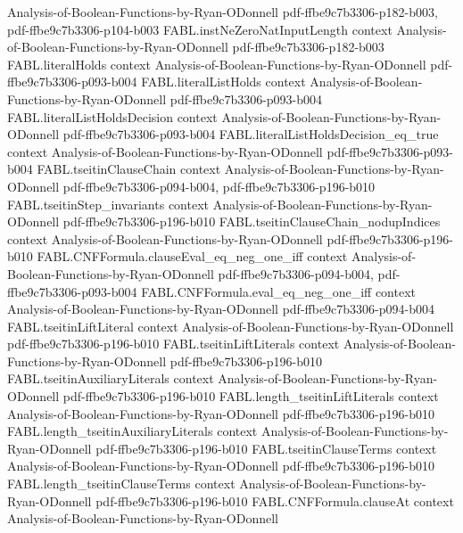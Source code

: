 \begin{theorem}
  {Analysis-of-Boolean-Functions-by-Ryan-ODonnell}
  {pdf-ffbe9c7b3306-p182-b003,
    pdf-ffbe9c7b3306-p104-b003}
\proofstep
  {FABL.instNeZeroNatInputLength}
  {context}
  {Analysis-of-Boolean-Functions-by-Ryan-ODonnell}
  {pdf-ffbe9c7b3306-p182-b003}
\proofstep
  {FABL.literalHolds}
  {context}
  {Analysis-of-Boolean-Functions-by-Ryan-ODonnell}
  {pdf-ffbe9c7b3306-p093-b004}
\proofstep
  {FABL.literalListHolds}
  {context}
  {Analysis-of-Boolean-Functions-by-Ryan-ODonnell}
  {pdf-ffbe9c7b3306-p093-b004}
\proofstep
  {FABL.literalListHoldsDecision}
  {context}
  {Analysis-of-Boolean-Functions-by-Ryan-ODonnell}
  {pdf-ffbe9c7b3306-p093-b004}
\proofstep
  {FABL.literalListHoldsDecision_eq_true}
  {context}
  {Analysis-of-Boolean-Functions-by-Ryan-ODonnell}
  {pdf-ffbe9c7b3306-p093-b004}
\proofstep
  {FABL.tseitinClauseChain}
  {context}
  {Analysis-of-Boolean-Functions-by-Ryan-ODonnell}
  {pdf-ffbe9c7b3306-p094-b004,
    pdf-ffbe9c7b3306-p196-b010}
\proofstep
  {FABL.tseitinStep_invariants}
  {context}
  {Analysis-of-Boolean-Functions-by-Ryan-ODonnell}
  {pdf-ffbe9c7b3306-p196-b010}
\proofstep
  {FABL.tseitinClauseChain_nodupIndices}
  {context}
  {Analysis-of-Boolean-Functions-by-Ryan-ODonnell}
  {pdf-ffbe9c7b3306-p196-b010}
\proofstep
  {FABL.CNFFormula.clauseEval_eq_neg_one_iff}
  {context}
  {Analysis-of-Boolean-Functions-by-Ryan-ODonnell}
  {pdf-ffbe9c7b3306-p094-b004,
    pdf-ffbe9c7b3306-p093-b004}
\proofstep
  {FABL.CNFFormula.eval_eq_neg_one_iff}
  {context}
  {Analysis-of-Boolean-Functions-by-Ryan-ODonnell}
  {pdf-ffbe9c7b3306-p094-b004}
\proofstep
  {FABL.tseitinLiftLiteral}
  {context}
  {Analysis-of-Boolean-Functions-by-Ryan-ODonnell}
  {pdf-ffbe9c7b3306-p196-b010}
\proofstep
  {FABL.tseitinLiftLiterals}
  {context}
  {Analysis-of-Boolean-Functions-by-Ryan-ODonnell}
  {pdf-ffbe9c7b3306-p196-b010}
\proofstep
  {FABL.tseitinAuxiliaryLiterals}
  {context}
  {Analysis-of-Boolean-Functions-by-Ryan-ODonnell}
  {pdf-ffbe9c7b3306-p196-b010}
\proofstep
  {FABL.length_tseitinLiftLiterals}
  {context}
  {Analysis-of-Boolean-Functions-by-Ryan-ODonnell}
  {pdf-ffbe9c7b3306-p196-b010}
\proofstep
  {FABL.length_tseitinAuxiliaryLiterals}
  {context}
  {Analysis-of-Boolean-Functions-by-Ryan-ODonnell}
  {pdf-ffbe9c7b3306-p196-b010}
\proofstep
  {FABL.tseitinClauseTerms}
  {context}
  {Analysis-of-Boolean-Functions-by-Ryan-ODonnell}
  {pdf-ffbe9c7b3306-p196-b010}
\proofstep
  {FABL.length_tseitinClauseTerms}
  {context}
  {Analysis-of-Boolean-Functions-by-Ryan-ODonnell}
  {pdf-ffbe9c7b3306-p196-b010}
\proofstep
  {FABL.CNFFormula.clauseAt}
  {context}
  {Analysis-of-Boolean-Functions-by-Ryan-ODonnell}

\end{theorem}
